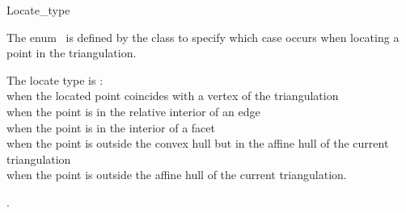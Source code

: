 
\ccModifierCrossRefOff
\begin{ccRefEnum}{Locate_type}  %


\ccDefinition
  
The enum \ccRefName\ is defined by the
class to specify
which case occurs when locating a point in the triangulation. 

{The locate type is : \\
 when the located point coincides 
with a vertex of the triangulation \\
 when the point is in the relative interior of an edge \\
 when the point is in the interior of a facet  \\
 when the point
is  outside the convex hull but in the affine hull of the current triangulation \\
when the point is outside the affine hull
of the current triangulation.}

\ccSeeAlso
{}.

\end{ccRefEnum}
\ccModifierCrossRefOn





